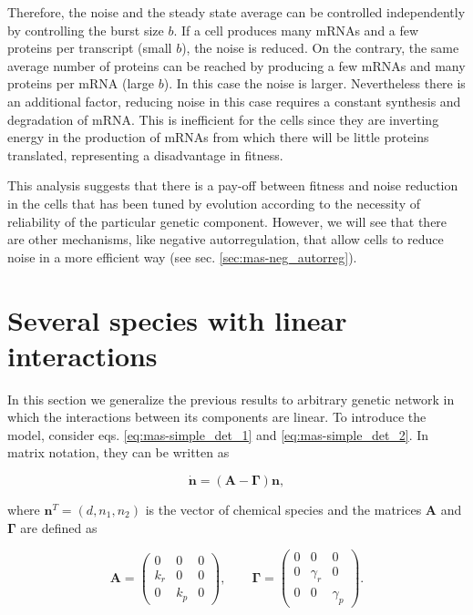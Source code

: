 Therefore, the noise and the steady state average can be controlled independently by controlling the burst size $b$. If a cell produces many mRNAs and a few proteins per transcript (small $b$), the noise is reduced. On the contrary, the same average number of proteins can be reached by producing a few mRNAs and many proteins per mRNA (large $b$). In this case the noise is larger. Nevertheless there is an additional factor, reducing noise in this case requires a constant synthesis and degradation of mRNA. This is inefficient for the cells since they are inverting energy in the production of mRNAs from which there will be little proteins translated, representing a disadvantage in fitness. 

This analysis suggests that there is a pay-off between fitness and noise reduction in the cells that has been tuned by evolution according to the necessity of reliability of the particular genetic component. However, we will see that there are other mechanisms, like negative autorregulation, that allow cells to reduce noise in a more efficient way (see sec. \ref{sec:mas-neg_autorreg}).

\section{Several species with linear interactions}

In this section we generalize the previous results to arbitrary genetic network in which the interactions between its components are linear. To introduce the model, consider eqs. \eqref{eq:mas-simple_det_1} and \eqref{eq:mas-simple_det_2}. In matrix notation, they can be written as

\begin{equation}
  \label{eq:matdet}
  \mathbf{\dot{n}} = \left( \mathbf{A} - \mathbf{\Gamma} \right) \mathbf{n},
\end{equation}

where $\mathbf{n}^T=(d,n_1,n_2)$ is the vector of chemical species and the matrices $\mathbf{A}$ and $\mathbf{\Gamma}$ are defined as

\begin{equation*}
  \mathbf{A} =
  \begin{pmatrix}
    0 & 0 & 0 \\
    k_r & 0 & 0 \\
    0 & k_p & 0
  \end{pmatrix},\quad \quad
  \mathbf{\Gamma} =
  \begin{pmatrix}
    0 & 0 & 0 \\
    0 & \gamma_r & 0 \\
    0 & 0 & \gamma_p
  \end{pmatrix}.
\end{equation*}

